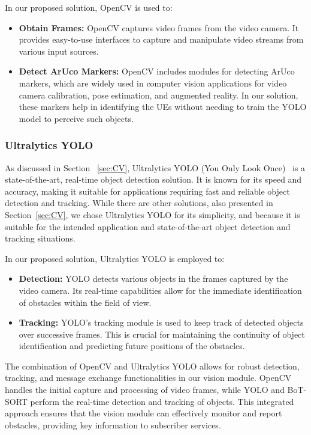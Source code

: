 In our proposed solution, OpenCV is used to:
\begin{itemize}
    \item \textbf{Obtain Frames:} OpenCV captures video frames from the video camera.
    It provides easy-to-use interfaces to capture and manipulate video streams from various input sources.
    \item \textbf{Detect ArUco Markers:} OpenCV includes modules for detecting ArUco markers, which are widely used in computer vision applications for video camera calibration, pose estimation, and augmented reality.
    In our solution, these markers help in identifying the UEs without needing to train the YOLO model to perceive such objects.
\end{itemize}

\subsubsection{Ultralytics YOLO}
As discussed in Section ~\ref{sec:CV}, Ultralytics YOLO (You Only Look Once)~\cite{ultralytics_docs} is a state-of-the-art, real-time object detection solution.
It is known for its speed and accuracy, making it suitable for applications requiring fast and reliable object detection and tracking.
While there are other solutions, also presented in Section~\ref{sec:CV}, we chose Ultralytics YOLO for its simplicity, and because it is suitable for the intended application and state-of-the-art object detection and tracking situations.

In our proposed solution, Ultralytics YOLO is employed to:
\begin{itemize}
    \item \textbf{Detection:} YOLO detects various objects in the frames captured by the video camera.
    Its real-time capabilities allow for the immediate identification of obstacles within the field of view.
    \item \textbf{Tracking:} YOLO’s tracking module is used to keep track of detected objects over successive frames.
    This is crucial for maintaining the continuity of object identification and predicting future positions of the obstacles. %
\end{itemize}

The combination of OpenCV and Ultralytics YOLO allows for robust detection, tracking, and message exchange functionalities in our vision module.
OpenCV handles the initial capture and processing of video frames, while YOLO and BoT-SORT perform the real-time detection and tracking of objects.
This integrated approach ensures that the vision module can effectively monitor and report obstacles, providing key information to subscriber services.

